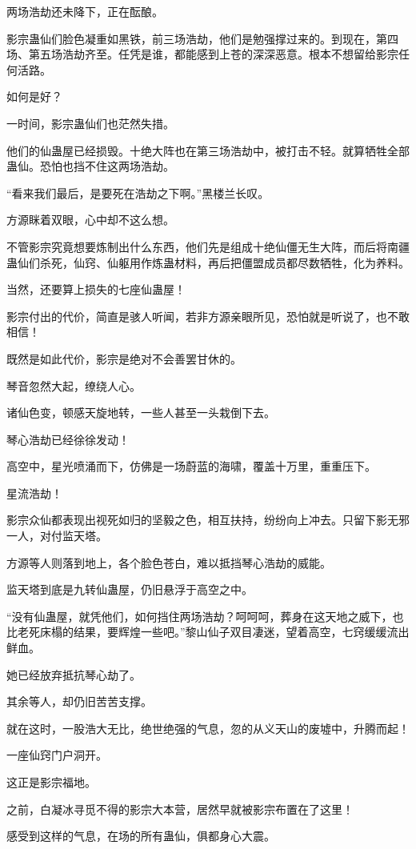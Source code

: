 \begin{this_body}
两场浩劫还未降下，正在酝酿。

影宗蛊仙们脸色凝重如黑铁，前三场浩劫，他们是勉强撑过来的。到现在，第四场、第五场浩劫齐至。任凭是谁，都能感到上苍的深深恶意。根本不想留给影宗任何活路。

如何是好？

一时间，影宗蛊仙们也茫然失措。

他们的仙蛊屋已经损毁。十绝大阵也在第三场浩劫中，被打击不轻。就算牺牲全部蛊仙。恐怕也挡不住这两场浩劫。

“看来我们最后，是要死在浩劫之下啊。”黑楼兰长叹。

方源眯着双眼，心中却不这么想。

不管影宗究竟想要炼制出什么东西，他们先是组成十绝仙僵无生大阵，而后将南疆蛊仙们杀死，仙窍、仙躯用作炼蛊材料，再后把僵盟成员都尽数牺牲，化为养料。

当然，还要算上损失的七座仙蛊屋！

影宗付出的代价，简直是骇人听闻，若非方源亲眼所见，恐怕就是听说了，也不敢相信！

既然是如此代价，影宗是绝对不会善罢甘休的。

琴音忽然大起，缭绕人心。

诸仙色变，顿感天旋地转，一些人甚至一头栽倒下去。

琴心浩劫已经徐徐发动！

高空中，星光喷涌而下，仿佛是一场蔚蓝的海啸，覆盖十万里，重重压下。

星流浩劫！

影宗众仙都表现出视死如归的坚毅之色，相互扶持，纷纷向上冲去。只留下影无邪一人，对付监天塔。

方源等人则落到地上，各个脸色苍白，难以抵挡琴心浩劫的威能。

监天塔到底是九转仙蛊屋，仍旧悬浮于高空之中。

“没有仙蛊屋，就凭他们，如何挡住两场浩劫？呵呵呵，葬身在这天地之威下，也比老死床榻的结果，要辉煌一些吧。”黎山仙子双目凄迷，望着高空，七窍缓缓流出鲜血。

她已经放弃抵抗琴心劫了。

其余等人，却仍旧苦苦支撑。

就在这时，一股浩大无比，绝世绝强的气息，忽的从义天山的废墟中，升腾而起！

一座仙窍门户洞开。

这正是影宗福地。

之前，白凝冰寻觅不得的影宗大本营，居然早就被影宗布置在了这里！

感受到这样的气息，在场的所有蛊仙，俱都身心大震。


\end{this_body}
